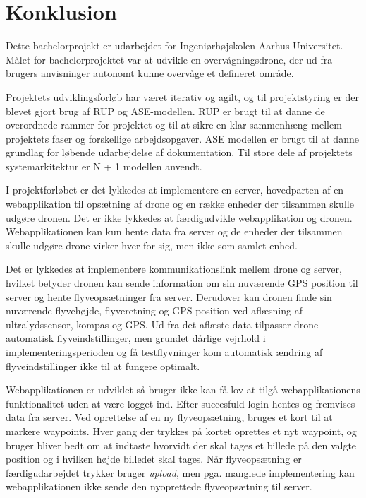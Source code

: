 \section{Konklusion}

Dette bachelorprojekt er udarbejdet for Ingeniørhøjskolen Aarhus Universitet. Målet for bachelorprojektet var at udvikle en overvågningsdrone, der ud fra brugers anvisninger autonomt kunne overvåge et defineret område. 

Projektets udviklingsforløb har været iterativ og agilt, og til projektstyring er der blevet gjort brug af RUP og ASE-modellen. RUP er brugt til at danne de overordnede rammer for projektet og til at sikre en klar sammenhæng mellem projektets faser og forskellige arbejdsopgaver. ASE modellen er brugt til at danne grundlag for løbende udarbejdelse af dokumentation. Til store dele af projektets systemarkitektur er N + 1 modellen anvendt.

I projektforløbet er det lykkedes at implementere en server, hovedparten af en webapplikation til opsætning af drone og en række enheder der tilsammen skulle udgøre dronen. Det er ikke lykkedes at færdigudvikle webapplikation og dronen. Webapplikationen kan kun hente data fra server og de enheder der tilsammen skulle udgøre drone virker hver for sig, men ikke som samlet enhed.

Det er lykkedes at implementere kommunikationslink mellem drone og server, hvilket betyder dronen kan sende information om sin nuværende GPS position til server og hente flyveopsætninger fra server. Derudover kan dronen finde sin nuværende flyvehøjde, flyveretning og GPS position ved aflæsning af ultralydssensor, kompas og GPS. Ud fra det aflæste data tilpasser drone automatisk flyveindstillinger, men grundet dårlige vejrhold i implementeringsperioden og få testflyvninger kom automatisk ændring af flyveindstillinger ikke til at fungere optimalt.

Webapplikationen er udviklet så bruger ikke kan få lov at tilgå webapplikationens funktionalitet uden at være logget ind. Efter succesfuld login hentes og fremvises data fra server. Ved oprettelse af en ny flyveopsætning, bruges et kort til at markere waypoints. Hver gang der trykkes på kortet oprettes et nyt waypoint, og bruger bliver bedt om at indtaste hvorvidt der skal tages et billede på den valgte position og i hvilken højde billedet skal tages.
Når flyveopsætning er færdigudarbejdet trykker bruger \textit{upload}, men pga. manglede implementering kan webapplikationen ikke sende den nyoprettede flyveopsætning til server. 

